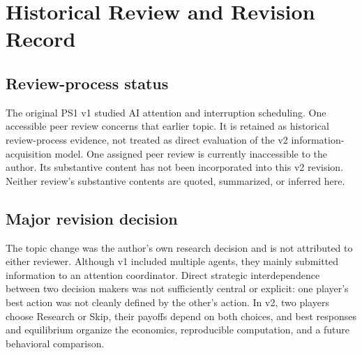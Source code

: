 \section{Historical Review and Revision Record}
\label{app:review}
\subsection{Review-process status}
The original PS1 v1 studied AI attention and interruption scheduling. One accessible peer review concerns that earlier topic. It is retained as historical review-process evidence, not treated as direct evaluation of the v2 information-acquisition model. One assigned peer review is currently inaccessible to the author. Its substantive content has not been incorporated into this v2 revision. Neither review's substantive contents are quoted, summarized, or inferred here.

\subsection{Major revision decision}
The topic change was the author's own research decision and is not attributed to either reviewer. Although v1 included multiple agents, they mainly submitted information to an attention coordinator. Direct strategic interdependence between two decision makers was not sufficiently central or explicit: one player's best action was not cleanly defined by the other's action. In v2, two players choose Research or Skip, their payoffs depend on both choices, and best responses and equilibrium organize the economics, reproducible computation, and a future behavioral comparison.

